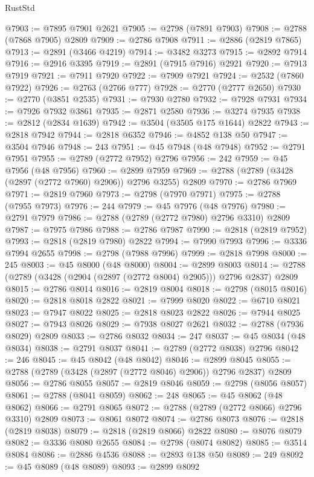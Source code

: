\begin{lexlean}{RustStd}
\begin{coremodule}
@7903 := @7895 @7901 @2621
@7905 := @2798 (@7891 @7903)
@7908 := @2788 (@7868 @7905) @2809
@7909 := @2786 @7908
@7911 := @2886 (@2819 @7865)
@7913 := @2891 (@3466 @4219)
@7914 := @3482 @3273
@7915 := @2892 @7914
@7916 := @2916 @3395
@7919 := @2891 (@7915 @7916) @2921
@7920 := @7913 @7919
@7921 := @7911 @7920
@7922 := @7909 @7921
@7924 := @2532 (@7860 @7922)
@7926 := @2763 (@2766 @777)
@7928 := @2770 (@2777 @2650)
@7930 := @2770 (@3851 @2535)
@7931 := @7930 @2780
@7932 := @7928 @7931
@7934 := @7926 @7932 @3861
@7935 := @2871 @2580
@7936 := @3274 @7935
@7938 := @2812 (@2834 @1639)
@7942 := @3504 (@3505 @175 @1644) @2822
@7943 := @2818 @7942
@7944 := @2818 @6352
@7946 := @4852 @138 @50
@7947 := @3504 @7946
@7948 := 243
@7951 := @45 @7948 (@48 @7948)
@7952 := @2791 @7951
@7955 := @2789 (@2772 @7952) @2796
@7956 := 242
@7959 := @45 @7956 (@48 @7956)
@7960 := @2899 @7959
@7969 := @2788 (@2789 (@3428 (@2897 (@2772 @7960) @2906)) @2796 @3255) @2809
@7970 := @2786 @7969
@7971 := @2819 @7960
@7973 := @2798 (@7970 @7971)
@7975 := @2788 (@7955 @7973)
@7976 := 244
@7979 := @45 @7976 (@48 @7976)
@7980 := @2791 @7979
@7986 := @2788 (@2789 (@2772 @7980) @2796 @3310) @2809
@7987 := @7975 @7986
@7988 := @2786 @7987
@7990 := @2818 (@2819 @7952)
@7993 := @2818 (@2819 @7980) @2822
@7994 := @7990 @7993
@7996 := @3336 @7994 @2655
@7998 := @2798 (@7988 @7996)
@7999 := @2818 @7998
@8000 := 245
@8003 := @45 @8000 (@48 @8000)
@8004 := @2899 @8003
@8014 := @2788 (@2789 (@3428 (@2904 (@2897 (@2772 @8004) @2905))) @2796 @2837) @2809
@8015 := @2786 @8014
@8016 := @2819 @8004
@8018 := @2798 (@8015 @8016)
@8020 := @2818 @8018 @2822
@8021 := @7999 @8020
@8022 := @6710 @8021
@8023 := @7947 @8022
@8025 := @2818 @8023 @2822
@8026 := @7944 @8025
@8027 := @7943 @8026
@8029 := @7938 @8027 @2621
@8032 := @2788 (@7936 @8029) @2809
@8033 := @2786 @8032
@8034 := 247
@8037 := @45 @8034 (@48 @8034)
@8038 := @2791 @8037
@8041 := @2789 (@2772 @8038) @2796
@8042 := 246
@8045 := @45 @8042 (@48 @8042)
@8046 := @2899 @8045
@8055 := @2788 (@2789 (@3428 (@2897 (@2772 @8046) @2906)) @2796 @2837) @2809
@8056 := @2786 @8055
@8057 := @2819 @8046
@8059 := @2798 (@8056 @8057)
@8061 := @2788 (@8041 @8059)
@8062 := 248
@8065 := @45 @8062 (@48 @8062)
@8066 := @2791 @8065
@8072 := @2788 (@2789 (@2772 @8066) @2796 @3310) @2809
@8073 := @8061 @8072
@8074 := @2786 @8073
@8076 := @2818 (@2819 @8038)
@8079 := @2818 (@2819 @8066) @2822
@8080 := @8076 @8079
@8082 := @3336 @8080 @2655
@8084 := @2798 (@8074 @8082)
@8085 := @3514 @8084
@8086 := @2886 @4536
@8088 := @2893 @138 @50
@8089 := 249
@8092 := @45 @8089 (@48 @8089)
@8093 := @2899 @8092

\end{coremodule}
\end{lexlean}
